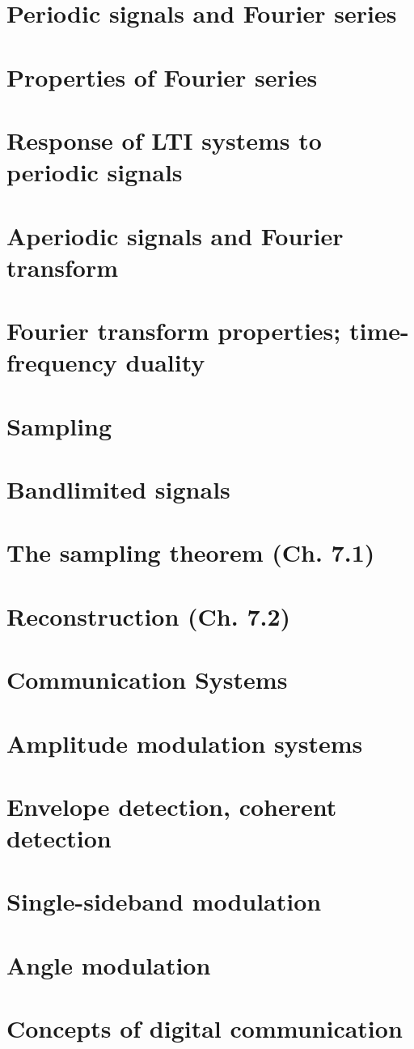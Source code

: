 \documentclass{article}
\begin{document}
\section{Periodic signals and Fourier series}
\newpage

\section{Properties of Fourier series}
\newpage

\section{Response of LTI systems to periodic signals}
\newpage

\section{Aperiodic signals and Fourier transform}
\newpage

\section{Fourier transform properties; time-frequency duality}
\newpage

\section*{Sampling}
\section{Bandlimited signals}
\newpage

\section{The sampling theorem (Ch. 7.1)}
\newpage

\section{Reconstruction (Ch. 7.2)}
\newpage

\section*{Communication Systems}
\section{Amplitude modulation systems}
\newpage

\section{Envelope detection, coherent detection}
\newpage

\section{Single-sideband modulation}
\newpage

\section{Angle modulation}
\newpage

\section{Concepts of digital communication}
\end{document}
